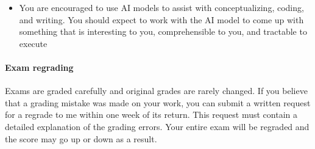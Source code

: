 \documentclass[11pt,english]{article}
\begin{document}
\begin{itemize}
\begin{itemize}
\begin{itemize}
            \item Turn this theoretical model into an empirical model that can be taken to data
            \item Write Julia code to simulate artificial data from your empirical model
            \item Either implement estimation procedures or calibrate parameters and validate through simulation
            \item Check the model's validity
            \item Execute one or more policy experiments
            \item Present your work in a structured report (10--15 pages) that includes:
            \begin{itemize}
                \item Motivation and economic question
                \item Theoretical model, empirical specification, and key assumptions
                \item Discussion of parameter identification
                \item Description of simulation and estimation procedures
                \item Simulated data description, parameter values used, and \textit{either} estimation validation results \textit{or} theoretical validation of calibrated parameters
                \item Policy experiments with \textbf{simulated counterfactual results} showing quantitative changes in outcomes
                \item Discussion of model limitations, potential extensions, and applicability to your dissertation work
            \end{itemize}
            \item Submit both the written report and well-documented Julia code as appendix
        \end{itemize}
        \item You are encouraged to use AI models to assist with conceptualizing, coding, and writing. You should expect to work with the AI model to come up with something that is interesting to you, comprehensible to you, and tractable to execute
    \end{itemize}
\end{itemize}

\paragraph{Exam regrading}
Exams are graded carefully and original grades are rarely changed. If you believe that a grading mistake was made on your work, you can submit a written request for a regrade to me within one week of its return. This request must contain a detailed explanation of the grading errors. Your entire exam will be regraded and the score may go up or down as a result.
\end{document}
